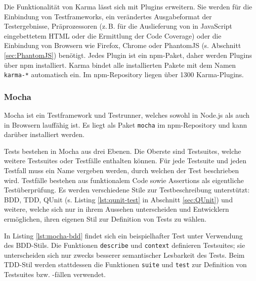 \begin{figure}[H]
	
\end{figure}

Die Funktionalität von Karma lässt sich mit Plugins erweitern. Sie werden für die Einbindung von Testframeworks, ein verändertes Ausgabeformat der Testergebnisse, Präprozessoren (z.\,B. für die Auslieferung von in JavaScript eingebettetem HTML oder die Ermittlung der Code Coverage) \cite{karma-preprocessors} oder die Einbindung von Browsern wie Firefox, Chrome oder PhantomJS (s. Abschnitt \ref{sec:PhantomJS}) benötigt. Jedes Plugin ist ein npm-Paket, daher werden Plugins über npm installiert. Karma bindet alle installierten Pakete mit dem Namen \texttt{karma-*} automatisch ein. \cite{karma-plugins} Im npm-Repository liegen über 1300 Karma-Plugins. \cite{karma-npm}

\subsubsection{Mocha}
\label{sec:Mocha}
Mocha ist ein Testframework und Testrunner, welches sowohl in Node.js als auch in Browsern lauffähig ist. Es liegt als Paket \texttt{mocha} im npm-Repository und kann darüber installiert werden. \cite{mocha-index}

Tests bestehen in Mocha aus drei Ebenen. Die Oberste sind Testsuites, welche weitere Testsuites oder Testfälle enthalten können. Für jede Testsuite und jeden Testfall muss ein Name vergeben werden, durch welchen der Test beschrieben wird. Testfälle bestehen aus funktionalem Code sowie Assertions als eigentliche Testüberprüfung. Es werden verschiedene Stile zur Testbeschreibung unterstützt: BDD, TDD, QUnit (s. Listing \ref{lst:qunit-test} in Abschnitt \ref{sec:QUnit}) und weitere, welche sich nur in ihrem Aussehen unterscheiden und Entwicklern ermöglichen, ihren eigenen Stil zur Definition von Tests zu wählen. \cite{mocha-index}

\begin{figure}[H]
	
\end{figure}

In Listing \ref{lst:mocha-bdd} findet sich ein beispielhafter Test unter Verwendung des BDD-Stils. Die Funktionen \texttt{describe} und \texttt{context} definieren Testsuites; sie unterscheiden sich nur zwecks besserer semantischer Lesbarkeit des Tests. Beim TDD-Stil werden stattdessen die Funktionen \texttt{suite} und \texttt{test} zur Definition von Testsuites bzw. -fällen verwendet. \cite{mocha-index}

